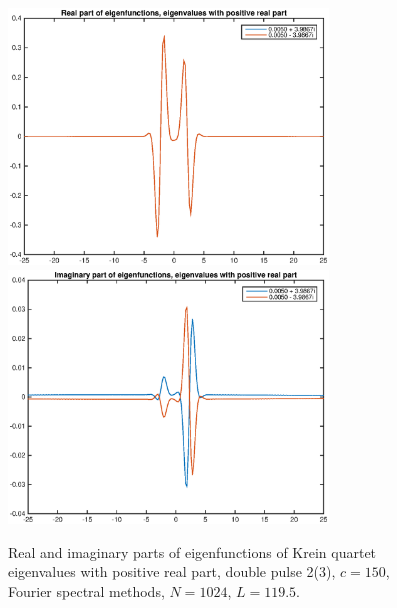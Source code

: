 \documentclass[12pt]{article}
\begin{document}
\begin{figure}[H]
	\includegraphics[width=8.5cm]{1500F_dp2_1195_eigposreal}
	\includegraphics[width=8.5cm]{1500F_dp2_1195_eigposimag}
	\caption{Real and imaginary parts of eigenfunctions of Krein quartet eigenvalues with positive real part, double pulse 2(3), $c = 150$, Fourier spectral methods, $N = 1024$, $L = 119.5$. }
\end{figure}
\end{document}

